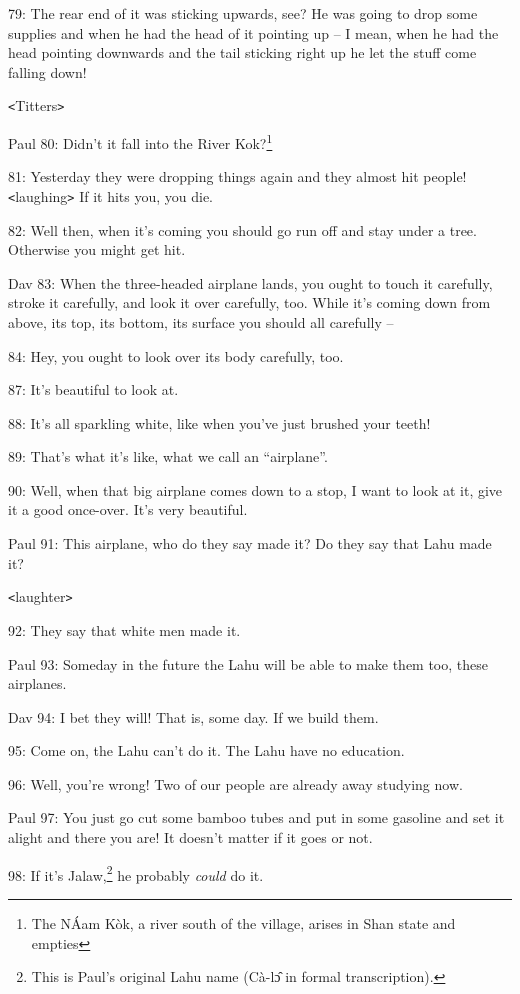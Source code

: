 79: The rear end of it was sticking upwards, see? He was going to drop some supplies
and when he had the head of it pointing up -- I mean, when he had the head pointing
downwards and the tail sticking right up he let the stuff come falling down!

\texttt{<}Titters\texttt{>}

Paul 80: Didn't it fall into the River Kok?\footnote{The NÁam Kòk, a river south of the village, arises in Shan state and empties}

81: Yesterday they were dropping things again and they almost hit people! \texttt{<}laughing\texttt{>}
If it hits you, you die.

82: Well then, when it's coming you should go run off and stay under a tree. Otherwise
you might get hit.

Dav 83: When the three-headed airplane lands, you ought to touch it carefully,
stroke it carefully, and look it over carefully, too. While it's coming down from
above, its top, its bottom, its surface you should all carefully --

84: Hey, you ought to look over its body carefully, too.

87: It's beautiful to look at.

88: It's all sparkling white, like when you've just brushed your teeth!

89: That's what it's like, what we call an ``airplane''.

90: Well, when that big airplane comes down to a stop, I want to look at it, give
it a good once-over. It's very beautiful.

Paul 91: This airplane, who do they say made it? Do they say that Lahu made it?

\texttt{<}laughter\texttt{>}

92: They say that white men made it.

Paul 93: Someday in the future the Lahu will be able to make them too, these airplanes.

Dav 94: I bet they will! That is, some day. If we build them.

95: Come on, the Lahu can't do it. The Lahu have no education.

96: Well, you're wrong! Two of our people are already away studying now.

Paul 97: You just go cut some bamboo tubes and put in some gasoline and set it
alight and there you are! It doesn't matter if it goes or not.

98: If it's Jalaw,\footnote{This is Paul's original Lahu name (Cà-lɔ̂ in formal transcription).} he probably \textit{could} do it.


